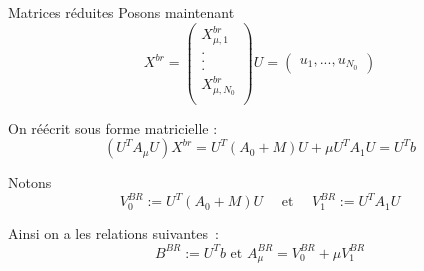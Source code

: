 \documentclass[10pt]{beamer}
\begin{document}
\begin{frame}{Matrices réduites}
\noindent Posons maintenant
$$
X^{br} = \begin{pmatrix}
X^{br}_{\mu,1} \\
. \\
. \\
. \\
X^{br}_{\mu,N_0} \\
\end{pmatrix} 
U = \begin{pmatrix}
u_1, ..., u_{N_0}
\end{pmatrix} 
$$

\noindent On réécrit  sous forme matricielle :
$$
(U^{T}A_{\mu}U)X^{br} = 
U^{T}(A_0 + M)U + \mu U^{T}A_1U = U^{T}b 
$$

\noindent Notons 
$$
V_{0}^{BR} := U^{T}(A_0 + M)U  \quad \text{   et   }  \quad  V_{1}^{BR} := U^{T}A_1U
$$

\noindent Ainsi on a les relations suivantes :
$$
B^{BR} := U^{T}b \text{    et    } A^{BR}_{\mu} = V_{0}^{BR} + \mu V_{1}^{BR}
$$

\end{frame}








\begin{comment}
Bonjour job à tous, je vais vous présenter mon stage qui s'intitule Algorithme Glouton par apprentissage , ce stage est réalisé à l'IRMA et supervisé par Monsieur Aghili Joubine .Il s'est déroulé du 1 juin au 31 juillet.
\end{comment}



\begin{comment}
Dans le cadre des EDP paramétrée,
\end{comment}
\end{document}
